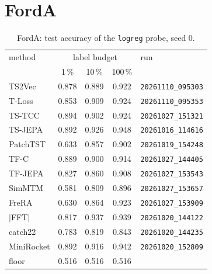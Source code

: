 \section{FordA}
\begin{table}[h]
\centering
\begin{tabular}{lcccl}
\toprule
method & \multicolumn{3}{c}{label budget} & run \\
 & 1\,\% & 10\,\% & 100\,\% & \\
\midrule
TS2Vec & 0.878 & 0.889 & 0.922 & \texttt{\footnotesize 20261110\_095303} \\
T-Loss & 0.853 & 0.909 & 0.924 & \texttt{\footnotesize 20261110\_095353} \\
TS-TCC & 0.894 & 0.902 & 0.924 & \texttt{\footnotesize 20261027\_151321} \\
TS-JEPA & 0.892 & 0.926 & 0.948 & \texttt{\footnotesize 20261016\_114616} \\
PatchTST & 0.633 & 0.857 & 0.902 & \texttt{\footnotesize 20261019\_154248} \\
TF-C & 0.889 & 0.900 & 0.914 & \texttt{\footnotesize 20261027\_144405} \\
TF-JEPA & 0.827 & 0.860 & 0.908 & \texttt{\footnotesize 20261027\_153543} \\
SimMTM & 0.581 & 0.809 & 0.896 & \texttt{\footnotesize 20261027\_153657} \\
FreRA & 0.630 & 0.864 & 0.923 & \texttt{\footnotesize 20261027\_153909} \\
\midrule
$|$FFT$|$ & 0.817 & 0.937 & 0.939 & \texttt{\footnotesize 20261020\_144122} \\
catch22 & 0.783 & 0.819 & 0.843 & \texttt{\footnotesize 20261020\_144235} \\
MiniRocket & 0.892 & 0.916 & 0.942 & \texttt{\footnotesize 20261020\_152809} \\
\midrule
floor & 0.516 & 0.516 & 0.516 & \\
\bottomrule
\end{tabular}
\caption{FordA: test accuracy of the \texttt{logreg} probe, seed 0.}
\end{table}

